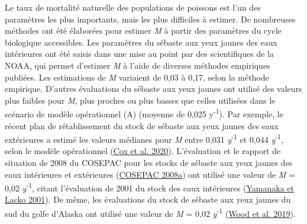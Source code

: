 \documentclass[french,11pt]{book}
\begin{document}
Le taux de mortalité naturelle des populations de poissons est l'un des paramètres les plus importants, mais les plus difficiles à estimer. De nombreuses méthodes ont été élaborées pour estimer \emph{M} à partir des paramètres du cycle biologique accessibles. Les paramètres du sébaste aux yeux jaunes des eaux intérieures ont été saisis dans une  mise au point par des scientifiques de la NOAA, qui permet d'estimer \emph{M} à l'aide de diverses méthodes empiriques publiées. Les estimations de \emph{M} variaient de 0,03 à 0,17, selon la méthode empirique. D'autres évaluations du sébaste aux yeux jaunes ont utilisé des valeurs plus faibles pour \emph{M}, plus proches ou plus basses que celles utilisées dans le scénario de modèle opérationnel (A) (moyenne de 0,025 y\textsuperscript{-1}). Par exemple, le récent plan de rétablissement du stock de sébaste aux yeux jaunes des eaux extérieures a estimé les valeurs médianes pour \emph{M} entre 0,031 \emph{y}\textsuperscript{-1} et 0,044 \emph{y}\textsuperscript{-1}, selon le modèle opérationnel (\protect\hyperlink{ref-cox2020}{Cox et al. 2020}). L'évaluation et le rapport de situation de 2008 du COSEPAC pour les stocks de sébaste aux yeux jaunes des eaux intérieures et extérieures (\protect\hyperlink{ref-cosewic2008}{COSEPAC 2008a}) ont utilisé une valeur de \emph{M} = 0,02 \emph{y}\textsuperscript{-1}, citant l'évaluation de 2001 du stock des eaux intérieures (\protect\hyperlink{ref-yamanaka2001}{Yamanaka et Lacko 2001}). De même, les évaluations du stock de sébaste aux yeux jaunes du sud du golfe d'Alaska ont utilisé une valeur de \emph{M} = 0,02 \emph{y}\textsuperscript{-1} (\protect\hyperlink{ref-wood2019}{Wood et al. 2019}).
\end{document}
